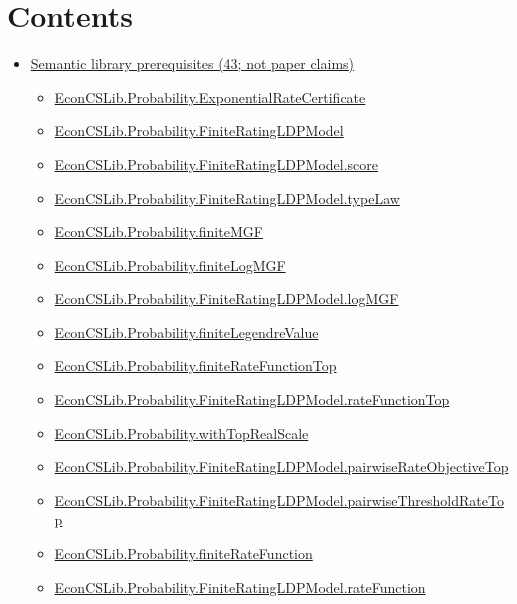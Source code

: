 \documentclass[10pt]{article}
\begin{document}
\section*{Contents}
\begin{itemize}[leftmargin=1.2em]
\item \hyperlink{library-section-2ddff18376f19241}{Semantic library prerequisites (43; not paper claims)}
\begin{itemize}[leftmargin=1.2em]
\item \hyperlink{library-prerequisite-e4ddb15be8735d63}{EconCSLib.Probability.ExponentialRateCertificate}
\item \hyperlink{library-prerequisite-943d19d91afe6d63}{EconCSLib.Probability.FiniteRatingLDPModel}
\item \hyperlink{library-prerequisite-c3203b699a19e900}{EconCSLib.Probability.FiniteRatingLDPModel.score}
\item \hyperlink{library-prerequisite-fc314aabfaabee42}{EconCSLib.Probability.FiniteRatingLDPModel.typeLaw}
\item \hyperlink{library-prerequisite-6258b3da52471ab5}{EconCSLib.Probability.finiteMGF}
\item \hyperlink{library-prerequisite-20dbd208a81d9e80}{EconCSLib.Probability.finiteLogMGF}
\item \hyperlink{library-prerequisite-c959d6e7b586c2bc}{EconCSLib.Probability.FiniteRatingLDPModel.logMGF}
\item \hyperlink{library-prerequisite-9a845b55d46c6585}{EconCSLib.Probability.finiteLegendreValue}
\item \hyperlink{library-prerequisite-f5f80f99b5e233aa}{EconCSLib.Probability.finiteRateFunctionTop}
\item \hyperlink{library-prerequisite-5730415067f1f9e2}{EconCSLib.Probability.FiniteRatingLDPModel.rateFunctionTop}
\item \hyperlink{library-prerequisite-6b1c12de9b0e61d5}{EconCSLib.Probability.withTopRealScale}
\item \hyperlink{library-prerequisite-e44116053cf1b7dc}{EconCSLib.Probability.FiniteRatingLDPModel.pairwiseRateObjectiveTop}
\item \hyperlink{library-prerequisite-0b0af8ce366c7c95}{EconCSLib.Probability.FiniteRatingLDPModel.pairwiseThresholdRateTop}
\item \hyperlink{library-prerequisite-c18ae7d47e6f18c1}{EconCSLib.Probability.finiteRateFunction}
\item \hyperlink{library-prerequisite-8c186fac243dedca}{EconCSLib.Probability.FiniteRatingLDPModel.rateFunction}

\end{itemize}
\end{itemize}
\end{document}
